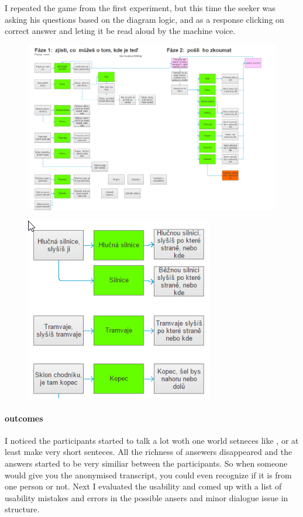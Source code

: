	  I repeated the game from the first experiment, but this time the seeker was asking his questions based on the diagram logic, and as a response clicking on correct answer and leting it be read aloud by the machine voice.
	 
\begin{figure}[h]
	\centering
	\includegraphics[width=0.7\linewidth]{figures/2ndExp-human2WoZOverMap/tested-dialogue}
	\caption[Dialogue]{}
	\caption{}
	\label{fig:tested-dialogue}
\end{figure}


\begin{figure}[h]
	\centering
	\includegraphics[width=0.7\linewidth]{figures/2ndExp-human2WoZOverMap/detail}
	\caption[Detail]{}
	\caption{}
	\label{fig:detail}
\end{figure}

\paragraph{outcomes}
I noticed the participants started to talk a lot woth one world setneces like ,  or at least make very short senteces. All the richness of ansewers disappeared and the answers started to be very similiar between the participants. So when someone would give you the anonymised transcript, you could even recognize if it is from one person or not.
Next I evaluated the usability and comed up with a list of usability mistakes and errors in the possible ansers and minor dialogue issue in structure.

